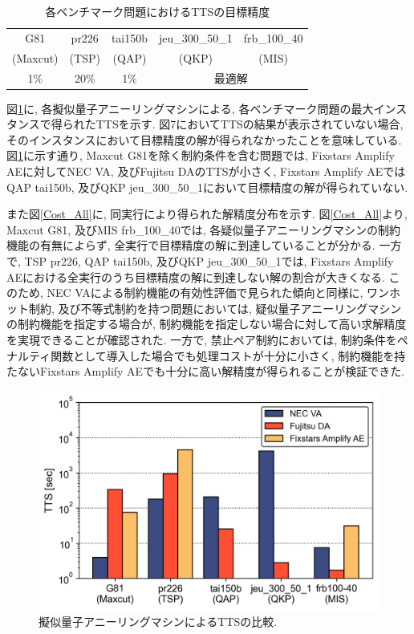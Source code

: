 \documentclass[submit,techrep,noauthor]{ipsj}
\begin{document}
\begin{table}[tb]
\centering
  \caption{各ベンチマーク問題におけるTTSの目標精度}
    \begin{tabular}{|c|c|c|c|c|}
      \hline
      G81 & pr226 & tai150b & jeu\_300\_50\_1 & frb\_100\_40\\
      (Maxcut) & (TSP) & (QAP) & (QKP) & (MIS)\\
      \cline{1-1} \cline{2-2} \cline{3-3} \cline{4-4} \cline{5-5}
       1\% & 20\% & 1\% & \multicolumn{2}{|c|}{最適解}\\ \hline
    \end{tabular}
\label{table_target2}
\end{table}

図\ref{TTS_All}に, 各擬似量子アニーリングマシンによる, 各ベンチマーク問題の最大インスタンスで得られたTTSを示す. 図7においてTTSの結果が表示されていない場合, そのインスタンスにおいて目標精度の解が得られなかったことを意味している. 図\ref{TTS_All}に示す通り, Maxcut G81を除く制約条件を含む問題では, Fixstars Amplify AEに対してNEC VA, 及びFujitsu DAのTTSが小さく, Fixstars Amplify AEではQAP tai150b, 及びQKP jeu\_300\_50\_1において目標精度の解が得られていない. 

また図\ref{Cost_All}に, 同実行により得られた解精度分布を示す. 図\ref{Cost_All}より, Maxcut G81, 及びMIS frb\_100\_40では, 各疑似量子アニーリングマシンの制約機能の有無によらず, 全実行で目標精度の解に到達していることが分かる. 一方で, TSP pr226, QAP tai150b, 及びQKP jeu\_300\_50\_1では, Fixstars Amplify AEにおける全実行のうち目標精度の解に到達しない解の割合が大きくなる. このため, NEC VAによる制約機能の有効性評価で見られた傾向と同様に, ワンホット制約, 及び不等式制約を持つ問題においては, 疑似量子アニーリングマシンの制約機能を指定する場合が, 制約機能を指定しない場合に対して高い求解精度を実現できることが確認された. 一方で, 禁止ペア制約においては, 制約条件をペナルティ関数として導入した場合でも処理コストが十分に小さく, 制約機能を持たないFixstars Amplify AEでも十分に高い解精度が得られることが検証できた. 

\begin{figure}[tb]
\centering
\includegraphics[bb=0 0 700 230, width=15cm]{TTS_All.png}
\caption{擬似量子アニーリングマシンによるTTSの比較.}
\label{TTS_All}
\end{figure}
\end{document}
